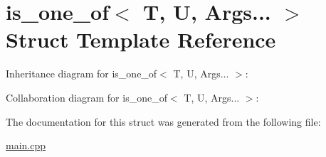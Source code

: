 \hypertarget{structis__one__of_3_01T_00_01U_00_01Args_8_8_8_01_4}{}\section{is\+\_\+one\+\_\+of$<$ T, U, Args... $>$ Struct Template Reference}
\label{structis__one__of_3_01T_00_01U_00_01Args_8_8_8_01_4}


Inheritance diagram for is\+\_\+one\+\_\+of$<$ T, U, Args... $>$\+:


Collaboration diagram for is\+\_\+one\+\_\+of$<$ T, U, Args... $>$\+:


The documentation for this struct was generated from the following file\+:\begin{DoxyCompactItemize}
\item 
\hyperlink{main_8cpp}{main.\+cpp}\end{DoxyCompactItemize}
